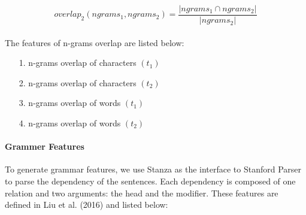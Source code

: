 \documentclass[12pt]{article}
\begin{document}
\begin{CJK*}{UTF8}{bkai}
\begin{spacing}{1.77}
\begin{equation}
  overlap_2(ngrams_1,ngrams_2)=\frac{|ngrams_1\cap ngrams_2|}{|ngrams_2|}
\end{equation}

\paragraph{}
The features of n-grams overlap are listed below:


\begin{enumerate}
    \item[ 1.] n-grams overlap of characters $(t_1)$
    \item[ 2.] n-grams overlap of characters $(t_2)$
    \item[ 3.] n-grams overlap of words $(t_1)$
    \item[ 4.] n-grams overlap of words $(t_2)$
\end{enumerate}

\paragraph{Grammer Features}
To generate grammar features, we use Stanza\cite{qi2020stanza} as the interface to Stanford Parser to parse the dependency of the sentences. Each dependency is composed of one relation and two arguments: the head and the modifier. These features are defined in Liu et al. (2016) and listed below:


\end{spacing}
\end{CJK*}
\end{document}

